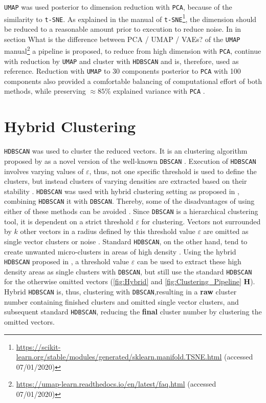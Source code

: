 \vspace{1em}

\texttt{UMAP} was used posterior to dimension reduction with \texttt{PCA}, because of the similarity to \texttt{t-SNE}. As explained in the manual of \texttt{t-SNE}\footnote{\url{https://scikit-learn.org/stable/modules/generated/sklearn.manifold.TSNE.html} (accessed 07/01/2020)}, the dimension should be reduced to a reasonable amount prior to execution to reduce noise. In in section \glqq What is the difference between PCA / UMAP / VAEs?\grqq{} of the \texttt{UMAP} manual\footnote{\url{https://umap-learn.readthedocs.io/en/latest/faq.html} (accessed 07/01/2020)} a pipeline is proposed, to reduce from high dimension with \texttt{PCA}, continue with reduction by \texttt{UMAP} and cluster with \texttt{HDBSCAN} and is, therefore, used as reference. Reduction with \texttt{UMAP} to 30 components posterior to \texttt{PCA} with 100 components also provided a comfortable balancing of computational effort of both methods, while preserving $\approx 85\%$ explained variance with \texttt{PCA} \autocite{mcinnes_umap_2020}. 

\section{Hybrid Clustering} \label{sec:HDBSCAN}

\texttt{HDBSCAN} was used to cluster the reduced vectors. It is an clustering algorithm proposed by \textcite{campello_hierarchical_2015} as a novel version of the well-known \texttt{DBSCAN} \autocite{hutchison_density-based_2013}. Execution of \texttt{HDBSCAN} involves varying values of $\varepsilon$, thus, not one specific threshold is used to define the clusters, but instead clusters of varying densities are extracted based on their stability \autocite{mcinnes_hdbscan_2017}. \texttt{HDBSCAN} was used with hybrid clustering setting as proposed in \textcite{malzer_hybrid_2020}, combining \texttt{HDBSCAN} it with \texttt{DBSCAN}. Thereby, some of the disadvantages of using either of these methods can be avoided \autocite{mcinnes_hdbscan_2017, moulavi_density-based_2014}. Since \texttt{DBSCAN} is a hierarchical clustering tool, it is dependent on a strict threshold $\varepsilon$ for clustering. Vectors not surrounded by $k$ other vectors in a radius defined by this threshold value $\varepsilon$ are omitted as single vector clusters or noise \autocite{ester_density-based_1996, schubert_dbscan_2017}. Standard \texttt{HDBSCAN}, on the other hand, tend to create unwanted micro-clusters in areas of high density \autocite{mcinnes_hdbscan_2017}. Using the hybrid \texttt{HDBSCAN} proposed in \autocite{malzer_hybrid_2020}, a threshold value $\varepsilon$ can be used to extract these high density areas as single clusters with \texttt{DBSCAN}, but still use the standard \texttt{HDBSCAN} for the otherwise omitted vectors (\autoref{fig:Hybrid} and \autoref{fig:Clustering_Pipeline} \textsf{\textbf{H}}). Hybrid \texttt{HDBSCAN} is, thus, clustering with \texttt{DBSCAN},resulting in a \textbf{raw} cluster number containing finished clusters and omitted single vector clusters, and subsequent standard \texttt{HDBSCAN}, reducing the \textbf{final} cluster number by clustering the omitted vectors.

